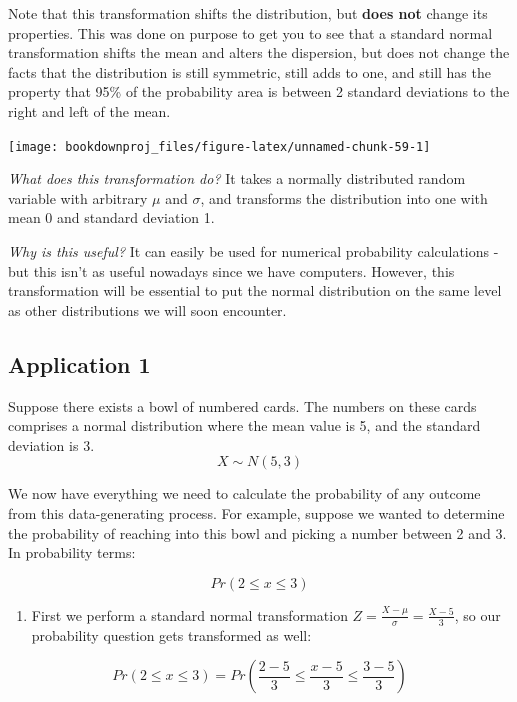 \documentclass[
]{book}
\providecommand{\tightlist}{%
  \setlength{\itemsep}{0pt}\setlength{\parskip}{0pt}}
\begin{document}
Note that this transformation shifts the distribution, but \textbf{does not} change its properties. This was done on purpose to get you to see that a standard normal transformation shifts the mean and alters the dispersion, but does not change the facts that the distribution is still symmetric, still adds to one, and still has the property that 95\% of the probability area is between 2 standard deviations to the right and left of the mean.

\begin{center}\texttt{[image: bookdownproj\_files/figure-latex/unnamed-chunk-59-1]} \end{center}

\emph{What does this transformation do?} It takes a normally distributed random variable with arbitrary \(\mu\) and \(\sigma\), and transforms the distribution into one with mean 0 and standard deviation 1.

\emph{Why is this useful?} It can easily be used for numerical probability calculations - but this isn't as useful nowadays since we have computers. However, this transformation will be essential to put the normal distribution on the same level as other distributions we will soon encounter.

\hypertarget{application-1}{%
\subsection{Application 1}\label{application-1}}

Suppose there exists a bowl of numbered cards. The numbers on these cards comprises a normal distribution where the mean value is 5, and the standard deviation is 3.
\[X \sim N(5,3)\]

We now have everything we need to calculate the probability of any outcome from this data-generating process. For example, suppose we wanted to determine the probability of reaching into this bowl and picking a number between 2 and 3. In probability terms:

\[Pr(2 \leq x \leq 3)\]

\begin{enumerate}
\def\labelenumi{\arabic{enumi}.}
\tightlist
\item
  First we perform a standard normal transformation \(Z=\frac{X-\mu}{\sigma}=\frac{X-5}{3}\), so our probability question gets transformed as well:
\end{enumerate}

\[Pr(2 \leq x \leq 3)=Pr\left(\frac{2-5}{3} \leq \frac{x-5}{3} \leq \frac{3-5}{3}\right)\]
\end{document}
